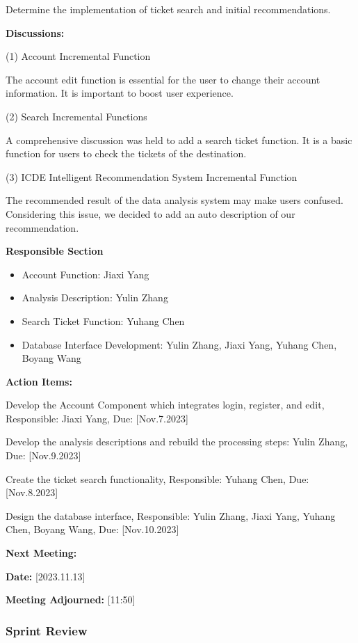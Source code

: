 \documentclass[conference]{IEEEtran}
\begin{document}
Determine the implementation of ticket search and initial recommendations.

\textbf{Discussions:}

(1) Account Incremental Function

The account edit function is essential for the user to change their account information. It is important to boost user experience. 

(2) Search Incremental Functions

A comprehensive discussion was held to add a search ticket function. It is a basic function for users to check the tickets of the destination.

(3) ICDE Intelligent Recommendation System Incremental Function

The recommended result of the data analysis system may make users confused. Considering this issue, we decided to add an auto description of our recommendation.

\textbf{Responsible Section}
\begin{itemize}
\item Account Function: Jiaxi Yang
\item Analysis Description: Yulin Zhang
\item Search Ticket Function: Yuhang Chen
\item Database Interface Development: Yulin Zhang, Jiaxi Yang, Yuhang Chen, Boyang Wang
\end{itemize}
\textbf{Action Items:}

Develop the Account Component which integrates login, register, and edit, Responsible: Jiaxi Yang, Due: [Nov.7.2023]

Develop the analysis descriptions and rebuild the processing steps: Yulin Zhang, Due: [Nov.9.2023]

Create the ticket search functionality, Responsible: Yuhang Chen, Due: [Nov.8.2023]

Design the database interface, Responsible: Yulin Zhang, Jiaxi Yang, Yuhang Chen, Boyang Wang, Due: [Nov.10.2023]

\textbf{Next Meeting:}

\textbf{Date:} [2023.11.13]

\textbf{Meeting Adjourned:} [11:50]



\subsubsection{\textbf{Sprint Review}}
\end{document}
